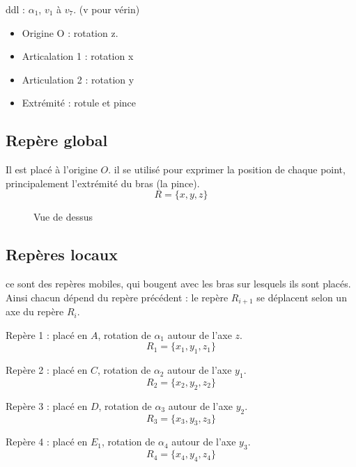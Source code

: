 \documentclass[12pt,a4paper]{article}
\begin{document}
ddl : $\alpha_1$, $v_1$ à $v_7$. (v pour vérin)\\
\begin{itemize}
	\item Origine O : rotation z.
	\item Articalation 1 : rotation x
	\item Articulation 2 : rotation y
	\item Extrémité : rotule et pince
\end{itemize}

\subsection{Repère global}

Il est placé à l'origine $O$. il se utilisé pour exprimer la position de chaque point, principalement l'extrémité du bras (la pince).
\begin{equation}
R=\{x,y,z\}
\end{equation}
\medbreak
\medbreak

\begin{figure}[H]
	\centering
	\caption{Vue de dessus}
\end{figure}

\subsection{Repères locaux}
ce sont des repères mobiles, qui bougent avec les bras sur lesquels ils sont placés. Ainsi chacun dépend du repère précédent : le repère $R_{i+1}$ se déplacent selon un axe du repère $R_i$.
\medbreak

Repère 1 : placé en $A$, rotation de $\alpha_1$ autour de l'axe $z$.
\begin{equation}
R_1=\{x_1,y_1,z_1\}
\end{equation}

\medbreak
Repère 2 : placé en $C$, rotation de $\alpha_2$ autour de l'axe $y_1$.
\begin{equation}
R_2=\{x_2,y_2,z_2\}
\end{equation}


\medbreak
Repère 3 : placé en $D$, rotation de $\alpha_3$ autour de l'axe $y_2$.
\begin{equation}
R_3=\{x_3,y_3,z_3\}
\end{equation}

\medbreak
Repère 4 : placé en $E_1$, rotation de $\alpha_4$ autour de l'axe $y_3$.
\begin{equation}
R_4=\{x_4,y_4,z_4\}
\end{equation}
\end{document}

